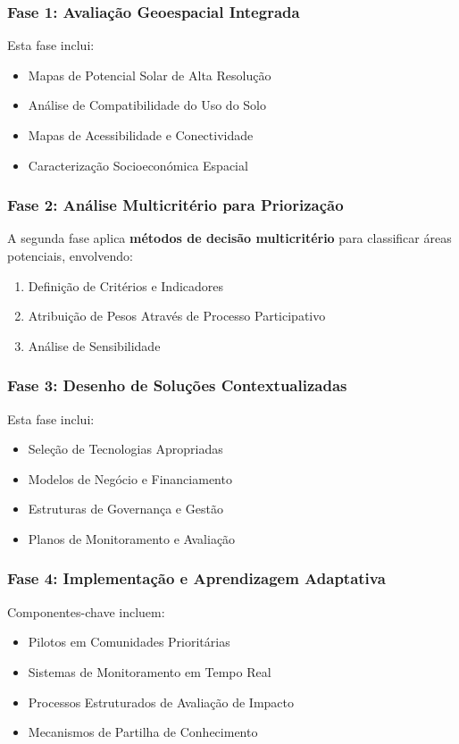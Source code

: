 \documentclass[12pt, a4paper]{article}
\begin{document}
\begin{itemize}
\subsubsection{Fase 1: Avaliação Geoespacial Integrada}

Esta fase inclui:
\begin{itemize}
\item Mapas de Potencial Solar de Alta Resolução
\item Análise de Compatibilidade do Uso do Solo
\item Mapas de Acessibilidade e Conectividade
\item Caracterização Socioeconómica Espacial
\end{itemize}

\subsubsection{Fase 2: Análise Multicritério para Priorização}

A segunda fase aplica \textbf{métodos de decisão multicritério} para classificar áreas potenciais, envolvendo:
\begin{enumerate}
\item Definição de Critérios e Indicadores
\item Atribuição de Pesos Através de Processo Participativo
\item Análise de Sensibilidade
\end{enumerate}

\subsubsection{Fase 3: Desenho de Soluções Contextualizadas}

Esta fase inclui:
\begin{itemize}
\item Seleção de Tecnologias Apropriadas
\item Modelos de Negócio e Financiamento
\item Estruturas de Governança e Gestão
\item Planos de Monitoramento e Avaliação
\end{itemize}

\subsubsection{Fase 4: Implementação e Aprendizagem Adaptativa}

Componentes-chave incluem:
\begin{itemize}
\item Pilotos em Comunidades Prioritárias
\item Sistemas de Monitoramento em Tempo Real
\item Processos Estruturados de Avaliação de Impacto
\item Mecanismos de Partilha de Conhecimento
\end{itemize}


\end{itemize}
\end{document}
